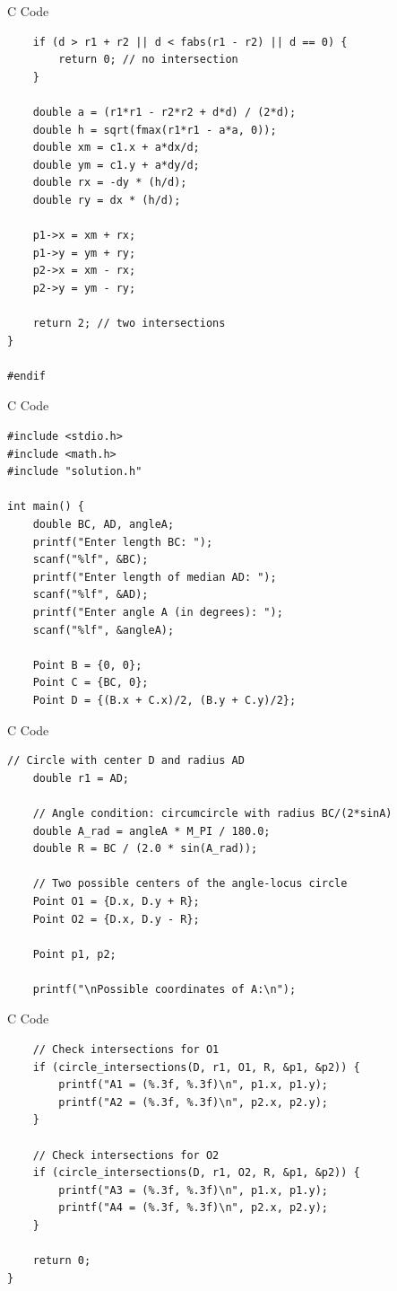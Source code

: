 \documentclass{beamer}
\begin{document}
\begin{frame}[fragile]{C Code}
    \begin{verbatim}
    if (d > r1 + r2 || d < fabs(r1 - r2) || d == 0) {
        return 0; // no intersection
    }

    double a = (r1*r1 - r2*r2 + d*d) / (2*d);
    double h = sqrt(fmax(r1*r1 - a*a, 0));
    double xm = c1.x + a*dx/d;
    double ym = c1.y + a*dy/d;
    double rx = -dy * (h/d);
    double ry = dx * (h/d);

    p1->x = xm + rx;
    p1->y = ym + ry;
    p2->x = xm - rx;
    p2->y = ym - ry;

    return 2; // two intersections
}

#endif
    \end{verbatim}
\end{frame}

\begin{frame}[fragile]{C Code}
    \begin{verbatim}
#include <stdio.h>
#include <math.h>
#include "solution.h"

int main() {
    double BC, AD, angleA;
    printf("Enter length BC: ");
    scanf("%lf", &BC);
    printf("Enter length of median AD: ");
    scanf("%lf", &AD);
    printf("Enter angle A (in degrees): ");
    scanf("%lf", &angleA);

    Point B = {0, 0};
    Point C = {BC, 0};
    Point D = {(B.x + C.x)/2, (B.y + C.y)/2};
    \end{verbatim}
\end{frame}

\begin{frame}[fragile]{C Code}
    \begin{verbatim}
// Circle with center D and radius AD
    double r1 = AD;

    // Angle condition: circumcircle with radius BC/(2*sinA)
    double A_rad = angleA * M_PI / 180.0;
    double R = BC / (2.0 * sin(A_rad));

    // Two possible centers of the angle-locus circle
    Point O1 = {D.x, D.y + R};
    Point O2 = {D.x, D.y - R};

    Point p1, p2;

    printf("\nPossible coordinates of A:\n");
    \end{verbatim}
\end{frame}

\begin{frame}[fragile]{C Code}
    \begin{verbatim}
    // Check intersections for O1
    if (circle_intersections(D, r1, O1, R, &p1, &p2)) {
        printf("A1 = (%.3f, %.3f)\n", p1.x, p1.y);
        printf("A2 = (%.3f, %.3f)\n", p2.x, p2.y);
    }

    // Check intersections for O2
    if (circle_intersections(D, r1, O2, R, &p1, &p2)) {
        printf("A3 = (%.3f, %.3f)\n", p1.x, p1.y);
        printf("A4 = (%.3f, %.3f)\n", p2.x, p2.y);
    }

    return 0;
}
    \end{verbatim}
\end{frame}
\end{document}
